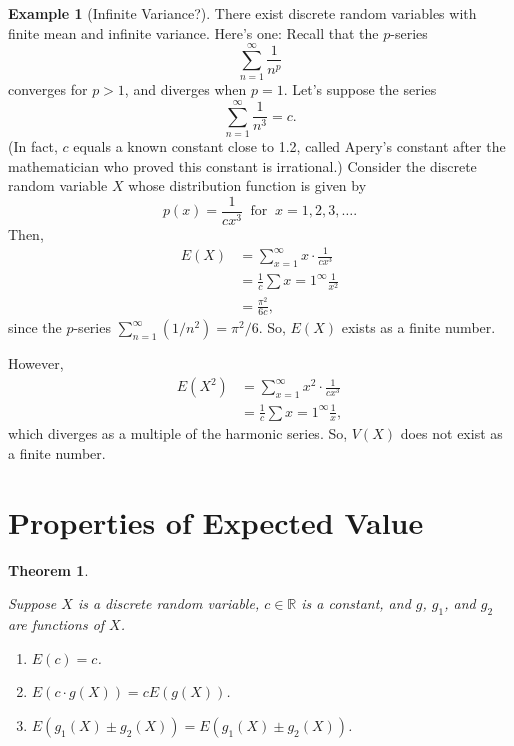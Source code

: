 \documentclass[
]{book}
\providecommand{\tightlist}{%
  \setlength{\itemsep}{0pt}\setlength{\parskip}{0pt}}
\newtheorem{theorem}{Theorem}[chapter]
\theoremstyle{definition}
\theoremstyle{definition}
\newtheorem{example}{Example}[chapter]
\theoremstyle{definition}
\theoremstyle{definition}
\theoremstyle{remark}
\begin{document}
\begin{example}[Infinite Variance?]
\protect\hypertarget{exm:infinite-variance}{}\label{exm:infinite-variance}There exist discrete random variables with finite mean and infinite variance. Here's one: Recall that the \(p\)-series \[\sum_{n=1}^\infty \frac{1}{n^p}\] converges for \(p > 1\), and diverges when \(p = 1\). Let's suppose the series \[\sum_{n=1}^\infty \frac{1}{n^3} = c.\]
(In fact, \(c\) equals a known constant close to 1.2, called Apery's constant after the mathematician who proved this constant is irrational.) Consider the discrete random variable \(X\) whose distribution function is given by \[p(x) = \frac{1}{cx^3} ~\text{ for }~ x = 1, 2, 3, \ldots.\]
Then,
\begin{align*}
E(X) &= \sum_{x=1}^\infty x \cdot \frac{1}{cx^3}\\
    &= \frac{1}{c} \sum{x=1}^\infty \frac{1}{x^2} \\
    &= \frac{\pi^2}{6c},
\end{align*}
since the \(p\)-series \(\sum_{n=1}^\infty (1/n^2) = \pi^2/6.\) So, \(E(X)\) exists as a finite number.

However,
\begin{align*}
E(X^2) &= \sum_{x=1}^\infty x^2 \cdot \frac{1}{cx^3}\\
    &= \frac{1}{c} \sum{x=1}^\infty \frac{1}{x},
\end{align*}
which diverges as a multiple of the harmonic series. So, \(V(X)\) does not exist as a finite number.
\end{example}

\section{Properties of Expected Value}\label{properties-of-expected-value}

\begin{theorem}
\protect\hypertarget{thm:EV-properties-discrete}{}\label{thm:EV-properties-discrete}

Suppose \(X\) is a discrete random variable, \(c \in \mathbb{R}\) is a constant, and \(g\), \(g_1\), and \(g_2\) are functions of \(X\).

\begin{enumerate}
\def\labelenumi{\arabic{enumi}.}
\tightlist
\item
  \(E(c) = c\).
\item
  \(E(c\cdot g(X))= cE(g(X))\).
\item
  \(E(g_1(X) \pm g_2(X)) = E(g_1(X)\pm g_2(X))\).
\end{enumerate}

\end{theorem}
\end{document}
